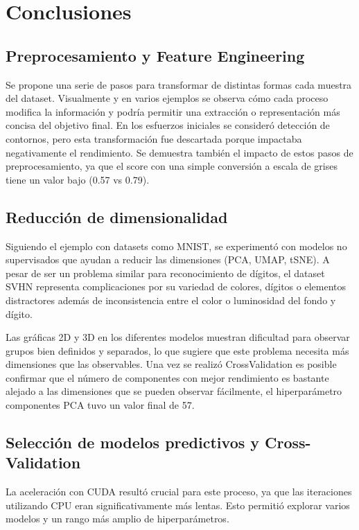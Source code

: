 \documentclass[journal]{IEEEtran}
\begin{document}
\section{Conclusiones}

\subsection{Preprocesamiento y Feature Engineering}
Se propone una serie de pasos para transformar de distintas formas cada muestra del dataset. Visualmente y en varios ejemplos se observa cómo cada proceso modifica la información y podría permitir una extracción o representación más concisa del objetivo final. En los esfuerzos iniciales se consideró detección de contornos, pero esta transformación fue descartada porque impactaba negativamente el rendimiento. Se demuestra también el impacto de estos pasos de preprocesamiento, ya que el score con una simple conversión a escala de grises tiene un valor bajo (0.57 vs 0.79).

\subsection{Reducción de dimensionalidad}
Siguiendo el ejemplo con datasets como MNIST, se experimentó con modelos no supervisados que ayudan a reducir las dimensiones (PCA, UMAP, tSNE). A pesar de ser un problema similar para reconocimiento de dígitos, el dataset SVHN representa complicaciones por su variedad de colores, dígitos o elementos distractores además de inconsistencia entre el color o luminosidad del fondo y dígito.

Las gráficas 2D y 3D en los diferentes modelos muestran dificultad para observar grupos bien definidos y separados, lo que sugiere que este problema necesita más dimensiones que las observables. Una vez se realizó CrossValidation es posible confirmar que el número de componentes con mejor rendimiento es bastante alejado a las dimensiones que se pueden observar fácilmente, el hiperparámetro componentes PCA tuvo un valor final de 57.

\subsection{Selección de modelos predictivos y Cross-Validation}
La aceleración con CUDA resultó crucial para este proceso, ya que las iteraciones utilizando CPU eran significativamente más lentas. Esto permitió explorar varios modelos y un rango más amplio de hiperparámetros.
\end{document}
